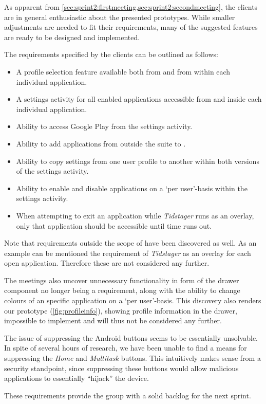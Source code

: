 As apparent from \cref{sec:sprint2:firstmeeting,sec:sprint2:secondmeeting}, the clients are in general enthusiastic about the presented prototypes.
While smaller adjustments are needed to fit their requirements, many of the suggested features are ready to be designed and implemented.

The requirements specified by the clients can be outlined as follows:

\begin{itemize}
\item A profile selection feature available both from \launcher and from within each individual application.
\item A settings activity for all enabled applications accessible from \launcher and inside each individual application.
\item Ability to access Google Play from the \launcher settings activity.
\item Ability to add applications from outside the \giraf suite to \launcher.
\item Ability to copy settings from one user profile to another within both versions of the settings activity.
\item Ability to enable and disable applications on a `per user'-basis within the \launcher settings activity.
\item When attempting to exit an application while \textit{Tidstager} runs as an overlay, only that application should be accessible until time runs out.
\end{itemize}

Note that requirements outside the scope of \launcher have been discovered as well.
As an example can be mentioned the requirement of \textit{Tidstager} as an overlay for each open application.
Therefore these are not considered any further.

The meetings also uncover unnecessary functionality in form of the drawer component no longer being a requirement, along with the ability to change colours of an specific application on a `per user'-basis.
This discovery also renders our prototype (\cref{fig:profileinfo}), showing profile information in the drawer, impossible to implement and will thus not be considered any further.

The issue of suppressing the Android buttons seems to be essentially unsolvable. 
In spite of several hours of research, we have been unable to find a means for suppressing the \textit{Home} and \textit{Multitask} buttons. 
This intuitively makes sense from a security standpoint, since suppressing these buttons would allow malicious applications to essentially ``hijack'' the device.

These requirements provide the group with a solid backlog for the next sprint.